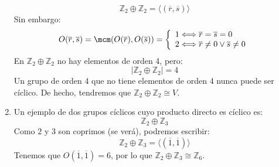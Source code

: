 \begin{ejemplo}
\begin{enumerate}
\begin{equation*}
                \mathbb{Z}_2\oplus\mathbb{Z}_2 = \langle (\overline{r},\overline{s}) \rangle 
            \end{equation*}
            Sin embargo:
            \begin{equation*}
                O(\overline{r},\overline{s}) = \mcm(O(\overline{r}),O(\overline{s})) = \left\{\begin{array}{l}
                    1 \Longleftrightarrow \overline{r}=\overline{s}=0 \\
                    2 \Longleftrightarrow \overline{r}\neq0 \lor \overline{s}\neq 0
                \end{array}\right.
            \end{equation*}
            En $\mathbb{Z}_2\oplus\mathbb{Z}_2$ no hay elementos de orden 4, pero:
            \begin{equation*}
                |\mathbb{Z}_2\oplus\mathbb{Z}_2| = 4
            \end{equation*}
            Un grupo de orden 4 que no tiene elementos de orden 4 nunca puede ser cíclico. De hecho, tendremos que $\mathbb{Z}_2\oplus\mathbb{Z}_2\cong V$.
        \item Un ejemplo de dos grupos cíclicos cuyo producto directo es cíclico es:
            \begin{equation*}
                \mathbb{Z}_2\oplus \mathbb{Z}_3
            \end{equation*}
            Como $2$ y $3$ son coprimos (se verá), podremos escribir:
            \begin{equation*}
                \mathbb{Z}_2\oplus \mathbb{Z}_3 = \langle (\overline{1},\overline{1}) \rangle 
            \end{equation*}
            Tenemos que $O(\overline{1},\overline{1}) = 6$, por lo que $\mathbb{Z}_2\oplus\mathbb{Z}_3 \cong \mathbb{Z}_6$.
    \end{enumerate}
\end{ejemplo}

